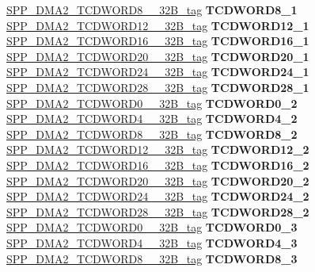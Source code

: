 \begin{DoxyCompactItemize}
\begin{tabbing}
\>\>\mbox{\hyperlink{unionSPP__DMA2__TCDWORD8____32B__tag}{SPP\_DMA2\_TCDWORD8\_\_32B\_tag}} {\bfseries TCDWORD8\_1}\\
\>\>\mbox{\hyperlink{unionSPP__DMA2__TCDWORD12____32B__tag}{SPP\_DMA2\_TCDWORD12\_\_32B\_tag}} {\bfseries TCDWORD12\_1}\\
\>\>\mbox{\hyperlink{unionSPP__DMA2__TCDWORD16____32B__tag}{SPP\_DMA2\_TCDWORD16\_\_32B\_tag}} {\bfseries TCDWORD16\_1}\\
\>\>\mbox{\hyperlink{unionSPP__DMA2__TCDWORD20____32B__tag}{SPP\_DMA2\_TCDWORD20\_\_32B\_tag}} {\bfseries TCDWORD20\_1}\\
\>\>\mbox{\hyperlink{unionSPP__DMA2__TCDWORD24____32B__tag}{SPP\_DMA2\_TCDWORD24\_\_32B\_tag}} {\bfseries TCDWORD24\_1}\\
\>\>\mbox{\hyperlink{unionSPP__DMA2__TCDWORD28____32B__tag}{SPP\_DMA2\_TCDWORD28\_\_32B\_tag}} {\bfseries TCDWORD28\_1}\\
\>\>\mbox{\hyperlink{unionSPP__DMA2__TCDWORD0____32B__tag}{SPP\_DMA2\_TCDWORD0\_\_32B\_tag}} {\bfseries TCDWORD0\_2}\\
\>\>\mbox{\hyperlink{unionSPP__DMA2__TCDWORD4____32B__tag}{SPP\_DMA2\_TCDWORD4\_\_32B\_tag}} {\bfseries TCDWORD4\_2}\\
\>\>\mbox{\hyperlink{unionSPP__DMA2__TCDWORD8____32B__tag}{SPP\_DMA2\_TCDWORD8\_\_32B\_tag}} {\bfseries TCDWORD8\_2}\\
\>\>\mbox{\hyperlink{unionSPP__DMA2__TCDWORD12____32B__tag}{SPP\_DMA2\_TCDWORD12\_\_32B\_tag}} {\bfseries TCDWORD12\_2}\\
\>\>\mbox{\hyperlink{unionSPP__DMA2__TCDWORD16____32B__tag}{SPP\_DMA2\_TCDWORD16\_\_32B\_tag}} {\bfseries TCDWORD16\_2}\\
\>\>\mbox{\hyperlink{unionSPP__DMA2__TCDWORD20____32B__tag}{SPP\_DMA2\_TCDWORD20\_\_32B\_tag}} {\bfseries TCDWORD20\_2}\\
\>\>\mbox{\hyperlink{unionSPP__DMA2__TCDWORD24____32B__tag}{SPP\_DMA2\_TCDWORD24\_\_32B\_tag}} {\bfseries TCDWORD24\_2}\\
\>\>\mbox{\hyperlink{unionSPP__DMA2__TCDWORD28____32B__tag}{SPP\_DMA2\_TCDWORD28\_\_32B\_tag}} {\bfseries TCDWORD28\_2}\\
\>\>\mbox{\hyperlink{unionSPP__DMA2__TCDWORD0____32B__tag}{SPP\_DMA2\_TCDWORD0\_\_32B\_tag}} {\bfseries TCDWORD0\_3}\\
\>\>\mbox{\hyperlink{unionSPP__DMA2__TCDWORD4____32B__tag}{SPP\_DMA2\_TCDWORD4\_\_32B\_tag}} {\bfseries TCDWORD4\_3}\\
\>\>\mbox{\hyperlink{unionSPP__DMA2__TCDWORD8____32B__tag}{SPP\_DMA2\_TCDWORD8\_\_32B\_tag}} {\bfseries TCDWORD8\_3}\\

\end{tabbing}
\end{DoxyCompactItemize}
